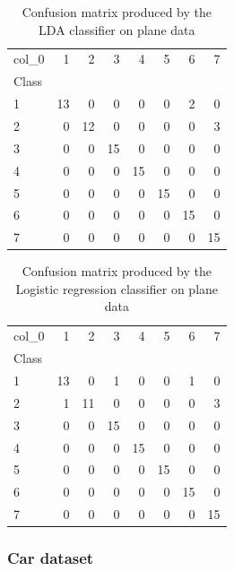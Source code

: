 \documentclass{article} %
\begin{document}
\begin{table}
\centering
\begin{tabular}{lrrrrrrr}
\toprule
col\_0 &   1 &   2 &   3 &   4 &   5 &   6 &   7 \\
Class &     &     &     &     &     &     &     \\
\midrule
1     &  13 &   0 &   0 &   0 &   0 &   2 &   0 \\
2     &   0 &  12 &   0 &   0 &   0 &   0 &   3 \\
3     &   0 &   0 &  15 &   0 &   0 &   0 &   0 \\
4     &   0 &   0 &   0 &  15 &   0 &   0 &   0 \\
5     &   0 &   0 &   0 &   0 &  15 &   0 &   0 \\
6     &   0 &   0 &   0 &   0 &   0 &  15 &   0 \\
7     &   0 &   0 &   0 &   0 &   0 &   0 &  15 \\
\bottomrule
\end{tabular}
\caption{Confusion matrix produced by the LDA classifier on plane data}
\label{tab:CM_PLANE_LDA}
\end{table}

\begin{table}
\centering
\begin{tabular}{lrrrrrrr}
\toprule
col\_0 &   1 &   2 &   3 &   4 &   5 &   6 &   7 \\
Class &     &     &     &     &     &     &     \\
\midrule
1     &  13 &   0 &   1 &   0 &   0 &   1 &   0 \\
2     &   1 &  11 &   0 &   0 &   0 &   0 &   3 \\
3     &   0 &   0 &  15 &   0 &   0 &   0 &   0 \\
4     &   0 &   0 &   0 &  15 &   0 &   0 &   0 \\
5     &   0 &   0 &   0 &   0 &  15 &   0 &   0 \\
6     &   0 &   0 &   0 &   0 &   0 &  15 &   0 \\
7     &   0 &   0 &   0 &   0 &   0 &   0 &  15 \\
\bottomrule
\end{tabular}
\caption{Confusion matrix produced by the Logistic regression classifier on plane data}
\label{tab:CM_PLANE_LR}
\end{table}

\subsubsection{Car dataset}
\end{document}
